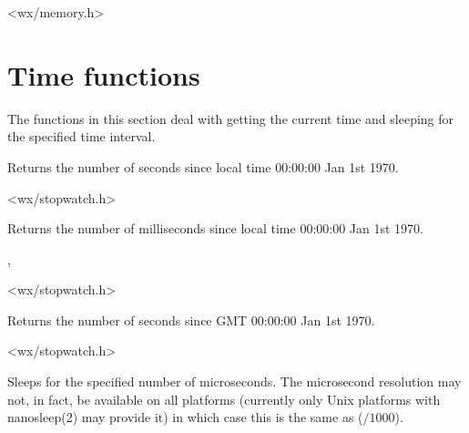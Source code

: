 <wx/memory.h>



\section{Time functions}\label{timefunctions}

The functions in this section deal with getting the current time and sleeping
for the specified time interval.


\label{wxgetlocaltime}


Returns the number of seconds since local time 00:00:00 Jan 1st 1970.




<wx/stopwatch.h>


\label{wxgetlocaltimemillis}


Returns the number of milliseconds since local time 00:00:00 Jan 1st 1970.


,\\


<wx/stopwatch.h>


\label{wxgetutctime}


Returns the number of seconds since GMT 00:00:00 Jan 1st 1970.




<wx/stopwatch.h>


\label{wxmicrosleep}


Sleeps for the specified number of microseconds. The microsecond resolution may
not, in fact, be available on all platforms (currently only Unix platforms with
nanosleep(2) may provide it) in which case this is the same as
($/1000$).


